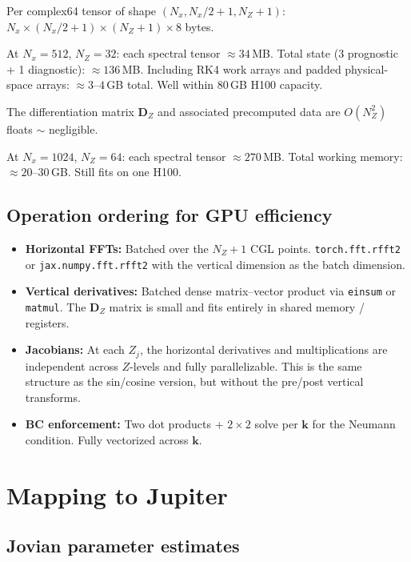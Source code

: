 \documentclass[11pt]{article}
\newcommand{\Dvec}{\bm{D}}
\begin{document}
Per complex64 tensor of shape $(N_x, N_x/2+1, N_Z+1)$: $N_x \times (N_x/2+1) \times (N_Z+1) \times 8$ bytes.

At $N_x = 512$, $N_Z = 32$: each spectral tensor $\approx 34$\,MB. Total state (3 prognostic + 1 diagnostic): $\approx 136$\,MB. Including RK4 work arrays and padded physical-space arrays: $\approx 3$--$4$\,GB total. Well within 80\,GB H100 capacity.

The differentiation matrix $\Dvec_Z$ and associated precomputed data are $O(N_Z^2)$ floats $\sim$ negligible.

At $N_x = 1024$, $N_Z = 64$: each spectral tensor $\approx 270$\,MB. Total working memory: $\approx 20$--$30$\,GB. Still fits on one H100.

\subsection{Operation ordering for GPU efficiency}

\begin{itemize}[nosep]
\item \textbf{Horizontal FFTs:} Batched over the $N_Z + 1$ CGL points. \texttt{torch.fft.rfft2} or \texttt{jax.numpy.fft.rfft2} with the vertical dimension as the batch dimension.
\item \textbf{Vertical derivatives:} Batched dense matrix--vector product via \texttt{einsum} or \texttt{matmul}. The $\Dvec_Z$ matrix is small and fits entirely in shared memory / registers.
\item \textbf{Jacobians:} At each $Z_j$, the horizontal derivatives and multiplications are independent across $Z$-levels and fully parallelizable. This is the same structure as the sin/cosine version, but without the pre/post vertical transforms.
\item \textbf{BC enforcement:} Two dot products + $2\times 2$ solve per $\bm{k}$ for the Neumann condition. Fully vectorized across $\bm{k}$.
\end{itemize}


\section{Mapping to Jupiter}
\label{sec:jupiter}

\subsection{Jovian parameter estimates}
\end{document}
